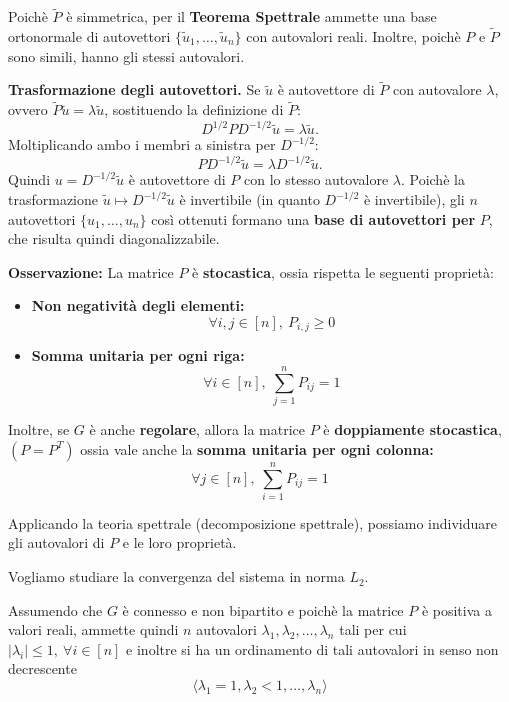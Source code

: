 Poichè $\tilde{P}$ è simmetrica, per il \textbf{Teorema Spettrale} ammette una base ortonormale di autovettori $\{\tilde{u}_1, \ldots, \tilde{u}_n\}$ con autovalori reali. Inoltre, poichè $P$ e $\tilde{P}$ sono simili, hanno gli stessi autovalori.

\textbf{Trasformazione degli autovettori.} Se $\tilde{u}$ è autovettore di $\tilde{P}$ con autovalore $\lambda$, ovvero $\tilde{P}\tilde{u} = \lambda\tilde{u}$, sostituendo la definizione di $\tilde{P}$:
\[
    D^{1/2}PD^{-1/2}\tilde{u} = \lambda\tilde{u}.
\]
Moltiplicando ambo i membri a sinistra per $D^{-1/2}$:
\[
    PD^{-1/2}\tilde{u} = \lambda D^{-1/2}\tilde{u}.
\]
Quindi $u = D^{-1/2}\tilde{u}$ è autovettore di $P$ con lo stesso autovalore $\lambda$. Poichè la trasformazione $\tilde{u} \mapsto D^{-1/2}\tilde{u}$ è invertibile (in quanto $D^{-1/2}$ è invertibile), gli $n$ autovettori $\{u_1, \ldots, u_n\}$ così ottenuti formano una \textbf{base di autovettori per} $P$, che risulta quindi diagonalizzabile.

\textbf{Osservazione:} La matrice $P$ è \textbf{stocastica}, ossia rispetta le seguenti proprietà:
\begin{itemize}
    \item \textbf{Non negatività degli elementi:}
    \[
        \forall i,j \in [n],\ P_{i,j} \geq 0
    \]
    \item \textbf{Somma unitaria per ogni riga:}
    \[
        \forall i \in [n],\ \sum_{j = 1}^{n} P_{ij} = 1
    \]
\end{itemize}
Inoltre, se $G$ è anche \textbf{regolare}, allora la matrice $P$ è \textbf{doppiamente stocastica}, $(P = P^T)$ ossia vale anche la \textbf{somma unitaria per ogni colonna:}
\[
    \forall j \in [n],\ \sum_{i = 1}^{n} P_{ij} = 1
\]

Applicando la teoria spettrale (decomposizione spettrale), possiamo individuare gli autovalori di $P$ e le loro proprietà.

Vogliamo studiare la convergenza del sistema in norma $L_2$.

\begin{lemma}
    Assumendo che $G$ è connesso e non bipartito e poichè la matrice $P$ è positiva a valori reali, ammette quindi $n$ autovalori $\lambda_1, \lambda_2, \dots, \lambda_n$ tali per cui $|\lambda_i| \leq 1,\ \forall i \in [n]$ e inoltre si ha un ordinamento di tali autovalori in senso non decrescente
    \[
        \langle \lambda_1 = 1, \lambda_2 < 1, \dots, \lambda_n \rangle
    \]
\end{lemma}

